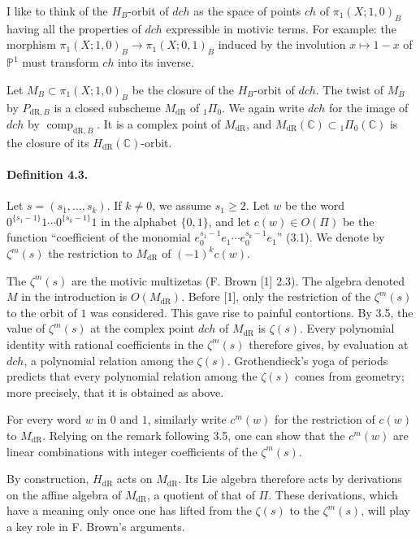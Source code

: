 \documentclass[10pt]{article}
\newcommand{\C}{\mathbb C}
\newcommand{\PP}{\mathbb P}
\newcommand{\comp}{\operatorname{comp}}
\newcommand{\dR}{\mathrm{dR}}
\begin{document}
I like to think of the $H_B$-orbit of $dch$ as the space of points $ch$ of $\pi_1(X;1,0)_B$ having all the properties of $dch$ expressible in motivic terms.
For example: the morphism $\pi_1(X;1,0)_B\to\pi_1(X;0,1)_B$ induced by the involution $x\mapsto1-x$ of $\PP^1$ must transform $ch$ into its inverse.

Let $M_B\subset\pi_1(X;1,0)_B$ be the closure of the $H_B$-orbit of $dch$.
The twist of $M_B$ by $P_{\dR,B}$ is a closed subscheme $M_{\dR}$ of ${}_1\Pi_0$.
We again write $dch$ for the image of $dch$ by $\comp_{\dR,B}$.
It is a complex point of $M_{\dR}$, and $M_{\dR}(\C)\subset{}_1\Pi_0(\C)$ is the closure of its $H_{\dR}(\C)$-orbit.

\paragraph{Definition 4.3.}
Let $s=(s_1,\ldots,s_k)$.
If $k\ne0$, we assume $s_1\geq2$.
Let $w$ be the word $0^{\{s_1-1\}}1\cdots 0^{\{s_k-1\}}1$ in the alphabet $\{0,1\}$, and let $c(w)\in O(\Pi)$ be the function ``coefficient of the monomial $e_0^{s_1-1}e_1\cdots e_0^{s_k-1}e_1$'' (3.1).
We denote by $\zeta^m(s)$ the restriction to $M_{\dR}$ of $(-1)^k c(w)$.

The $\zeta^m(s)$ are the motivic multizetas (F. Brown [1] 2.3).
The algebra denoted $M$ in the introduction is $O(M_{\dR})$.
Before [1], only the restriction of the $\zeta^m(s)$ to the orbit of $1$ was considered.
This gave rise to painful contortions.
By 3.5, the value of $\zeta^m(s)$ at the complex point $dch$ of $M_{\dR}$ is $\zeta(s)$.
Every polynomial identity with rational coefficients in the $\zeta^m(s)$ therefore gives, by evaluation at $dch$, a polynomial relation among the $\zeta(s)$.
Grothendieck's yoga of periods predicts that every polynomial relation among the $\zeta(s)$ comes from geometry; more precisely, that it is obtained as above.

For every word $w$ in $0$ and $1$, similarly write $c^m(w)$ for the restriction of $c(w)$ to $M_{\dR}$.
Relying on the remark following 3.5, one can show that the $c^m(w)$ are linear combinations with integer coefficients of the $\zeta^m(s)$.

By construction, $H_{\dR}$ acts on $M_{\dR}$.
Its Lie algebra therefore acts by derivations on the affine algebra of $M_{\dR}$, a quotient of that of $\Pi$.
These derivations, which have a meaning only once one has lifted from the $\zeta(s)$ to the $\zeta^m(s)$, will play a key role in F. Brown's arguments.
\end{document}
